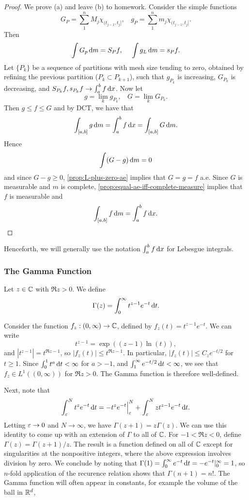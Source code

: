 \documentclass[12pt]{article} %
\begin{document}
\begin{proof}
    We prove (a) and leave (b) to homework. Consider the simple functions \[G_P = \sum_1^n M_j \chi_{(t_{j-1}, t_j]}, \ \ \ \ g_P = \sum_1^n m_j \chi_{(t_{j-1}, t_j]}.\] Then \[\int G_p \, \mathrm{d} m = S_P f, \ \ \ \ \int g_L \, \mathrm{d} m = s_P f.\] Let $\{P_k\}$ be a sequence of partitions with mesh size tending to zero, obtained by refining the previous partition ($P_k \subset P_{k+1}$), such that $g_{P_k}$ is increasing, $G_{P_k}$ is decreasing, and $S_{P_k} f, s_{P_k} f \to \int_a^b f \, \mathrm{d} x$. Now let \[g = \lim_k g_{P_k}, \ \ \ \ G = \lim_k G_{P_k}.\] Then $g \leq f \leq G$ and by DCT, we have that \[\int_{[a, b]} g \, \mathrm{d} m = \int_a^b f \, \mathrm{d} x = \int_{[a, b]} G \, \mathrm{d} m.\] Hence \[\int(G - g) \, \mathrm{d} m = 0\] and since $G - g \geq 0$, \cref{prop:L-plus-zero-ae} implies that $G = g = f$ a.e. Since $G$ is measurable and $m$ is complete, \cref{prop:equal-ae-iff-complete-measure} implies that $f$ is measurable and \[\int_{[a, b]} f \, \mathrm{d} m = \int_a^b f \, \mathrm{d} x.\]
\end{proof}

\noindent Henceforth, we will generally use the notation $\int_a^b f \, \mathrm{d} x$ for Lebesgue integrals.

\subsubsection{The Gamma Function}

\begin{definition}
    Let $z \in \mathbb{C}$ with $\Re z > 0$. We define \[\Gamma(z) = \int_0^\infty t^{z-1}e^{-t}\, \mathrm{d} t.\]
\end{definition}

\noindent Consider the function $f_z : (0, \infty) \to \mathbb{C}$, defined by $f_z(t) = t^{z-1}e^{-t}$. We can write \[t^{z-1} = \exp((z-1)\ln(t)),\] and $|t^{z-1}| = t^{\Re z - 1}$, so $|f_z(t)| \leq t^{\Re z - 1}$. In particular, $|f_z(t)| \leq C_z e^{-t/2}$ for $t \geq 1$. Since $\int_0^1 t^a \, \mathrm{d} t < \infty$ for $a > -1$, and $\int_1^\infty e^{-t/2} \, \mathrm{d} t < \infty$, we see that $f_z \in L^1((0, \infty))$ for $\Re z > 0$. The Gamma function is therefore well-defined.

Next, note that \[\int_\varepsilon^N t^z e^{-t} \, \mathrm{d} t = -t^z e^{-t} \Big|_\varepsilon^N + \int_\varepsilon^N z t^{z-1} e^{-t} \, \mathrm{d} t.\] Letting $\varepsilon \to 0$ and $N \to \infty$, we have $\Gamma(z+1) = z\Gamma(z)$. We can use this identity to come up with an extension of $\Gamma$ to all of $\mathbb{C}$. For $-1 < \Re z < 0$, define $\Gamma(z) = \Gamma(z+1) / z$. The result is a function defined on all of $\mathbb{C}$ except for singularities at the nonpositive integers, where the above expression involves division by zero. We conclude by noting that $\Gamma(1) = \int_0^\infty e^{-t} \, \mathrm{d} t = -e^{-t} |_0^\infty = 1$, so $n$-fold application of the recurence relation shows that $\Gamma(n+1) = n!$. The Gamma function will often appear in constants, for example the volume of the ball in $\mathbb{R}^d$,
\end{document}
